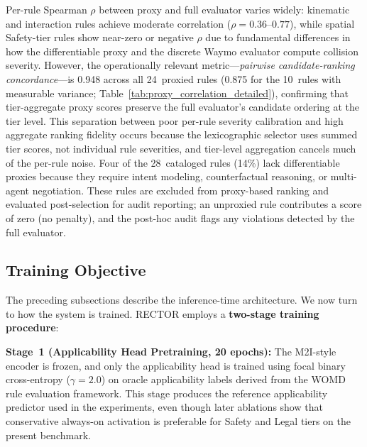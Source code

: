 Per-rule Spearman $\rho$ between proxy and full evaluator varies widely: kinematic and interaction rules achieve moderate correlation ($\rho{=}0.36$--$0.77$), while spatial Safety-tier rules show near-zero or negative $\rho$ due to fundamental differences in how the differentiable proxy and the discrete Waymo evaluator compute collision severity.  However, the operationally relevant metric---\emph{pairwise candidate-ranking concordance}---is 0.948 across all 24~proxied rules (0.875 for the 10~rules with measurable variance; Table~\ref{tab:proxy_correlation_detailed}), confirming that tier-aggregate proxy scores preserve the full evaluator's candidate ordering at the tier level.  This separation between poor per-rule severity calibration and high aggregate ranking fidelity occurs because the lexicographic selector uses summed tier scores, not individual rule severities, and tier-level aggregation cancels much of the per-rule noise.  Four of the 28~cataloged rules (14\%) lack differentiable proxies because they require intent modeling, counterfactual reasoning, or multi-agent negotiation.  These rules are excluded from proxy-based ranking and evaluated post-selection for audit reporting; an unproxied rule contributes a score of zero (no penalty), and the post-hoc audit flags any violations detected by the full evaluator.

\subsection{Training Objective}
\label{subsec:training_objective}

The preceding subsections describe the inference-time architecture.  We now turn to how the system is trained.  RECTOR employs a \textbf{two-stage training procedure}:

\noindent\textbf{Stage~1 (Applicability Head Pretraining, 20 epochs):} The M2I-style encoder is frozen, and only the applicability head is trained using focal binary cross-entropy ($\gamma{=}2.0$) on oracle applicability labels derived from the WOMD rule evaluation framework.  This stage produces the reference applicability predictor used in the experiments, even though later ablations show that conservative always-on activation is preferable for Safety and Legal tiers on the present benchmark.

